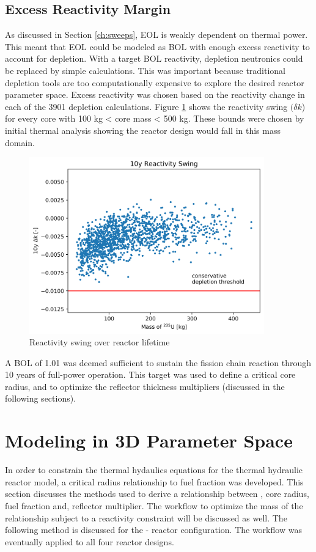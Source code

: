 \subsection{Excess Reactivity Margin}
As discussed in Section \ref{ch:sweeps}, EOL \keff is weakly dependent on
thermal power. This meant that EOL \keff could be modeled as BOL \keff with enough
excess reactivity to account for depletion. With a target BOL reactivity,
depletion neutronics could be replaced by simple \keff calculations. This
was important because traditional depletion tools are too computationally
expensive to explore the desired reactor parameter space. Excess reactivity was
chosen based on the reactivity change in each of the 3901 depletion calculations. Figure
\ref{fig:delta_k_eol} shows the reactivity swing $(\delta k$) for every core
with 100 kg < core mass < 500 kg. These bounds were chosen by initial thermal analysis
showing the reactor design would fall in this mass domain.

\begin{figure}[h]
    \centering
    \includegraphics[width=4in]{../images/dK_vs_mass.png}
\caption{Reactivity swing over reactor lifetime}
\label{fig:delta_k_eol}
\end{figure}

A BOL \keff of 1.01 was deemed sufficient to sustain the fission chain reaction
through 10 years of full-power operation. This \keff target was used to define a
critical core radius, and to optimize the reflector thickness multipliers
(discussed in the following sections).

\section{Modeling \keff in 3D Parameter Space}\label{sec:crit_model}
In order to constrain the thermal hydaulics equations for the 
thermal hydraulic reactor model, a critical radius relationship to fuel fraction was developed. 
This section discusses the methods used to derive a relationship between \keff,
core radius, fuel fraction and, reflector multiplier. The workflow to
optimize the mass of the \keff relationship subject to a reactivity constraint
will be discussed as well. The following method is discussed for the \uox-\codiox
reactor configuration. The workflow was eventually applied to all four reactor
designs.

